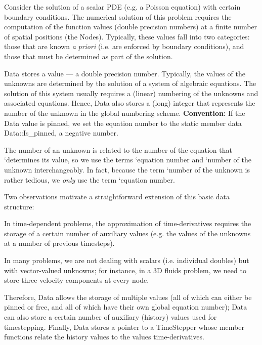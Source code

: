 Consider the solution of a scalar P\+DE (e.\+g. a Poisson equation) with certain boundary conditions. The numerical solution of this problem requires the computation of the function values (double precision numbers) at a finite number of spatial positions (the {\ttfamily Nodes}). Typically, these values fall into two categories\+: those that are known {\itshape a} {\itshape priori} (i.\+e. are enforced by boundary conditions), and those that must be determined as part of the solution.

{\ttfamily Data} stores a value --- a double precision number. Typically, the values of the unknowns are determined by the solution of a system of algebraic equations. The solution of this system usually requires a (linear) numbering of the unknowns and associated equations. Hence, {\ttfamily Data} also stores a (long) integer that represents the number of the unknown in the global numbering scheme. {\bfseries Convention\+:} If the {\ttfamily Data} value is pinned, we set the equation number to the static member data {\ttfamily Data\+::\+Is\+\_\+pinned}, a negative number.

The number of an unknown is related to the number of the equation that `determines its value\textquotesingle{}, so we use the terms `equation number\textquotesingle{} and `number of the unknown\textquotesingle{} interchangeably. In fact, because the term `number of the unknown\textquotesingle{} is rather tedious, we {\itshape only} use the term `equation number\textquotesingle{}.

Two observations motivate a straightforward extension of this basic data structure\+:


\begin{DoxyItemize}
\item In time-\/dependent problems, the approximation of time-\/derivatives requires the storage of a certain number of auxiliary values (e.\+g. the values of the unknowns at a number of previous timesteps).
\item In many problems, we are not dealing with scalars (i.\+e. individual doubles) but with vector-\/valued unknowns; for instance, in a 3D fluids problem, we need to store three velocity components at every node.
\end{DoxyItemize}

Therefore, {\ttfamily Data} allows the storage of multiple values (all of which can either be pinned or free, and all of which have their own global equation number); {\ttfamily Data} can also store a certain number of auxiliary (history) values used for timestepping. Finally, {\ttfamily Data} stores a pointer to a {\ttfamily Time\+Stepper} whose member functions relate the history values to the values\textquotesingle{} time-\/derivatives.

